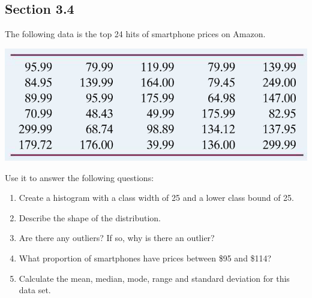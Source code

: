 \documentclass[12pt]{scrartcl}
\theoremstyle{definition}
\begin{document}
\subsection*{Section 3.4}
The following data is the top 24 hits of smartphone prices on Amazon.
\begin{center}
	\includegraphics[scale=0.5]{ReviewSec34}
\end{center} 
Use it to answer the following questions:
\begin{enumerate}
	\item Create a histogram with a class width of 25 and a lower class bound of 25.
	\item Describe the shape of the distribution.
	\item Are there any outliers? If so, why is there an outlier?
	\item What proportion of smartphones have prices between \$95 and \$114?
	\item Calculate the mean, median, mode, range and standard deviation for this data set.
\end{enumerate}
\end{document}
